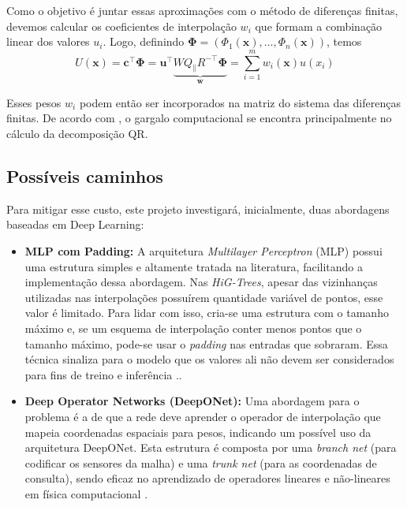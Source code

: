 \documentclass[
	12pt,				%
	oneside,			%
	a4paper,			%
	english,			%
	brazilian,				%
	]{article}
\begin{document}
	Como o objetivo é juntar essas aproximações com o método de diferenças finitas, devemos calcular os coeficientes de interpolação $w_i$ que formam a combinação linear dos valores $u_i$. Logo, definindo $\boldsymbol{\Phi} = (\Phi_1(\mathbf{x}), \dots, \Phi_n(\mathbf{x}))$, temos
	\begin{equation}
		U(\mathbf{x}) = \mathbf{c}^\top \boldsymbol{\Phi} = \mathbf{u}^\top \underbrace{W Q_{\parallel} R^{-\top} \boldsymbol{\Phi}}_{\mathbf{w}} = \sum_{i=1}^{m}w_i(\mathbf{x})u(x_i)
	\end{equation}
	
	Esses pesos $w_i$ podem então ser incorporados na matriz do sistema das diferenças finitas. De acordo com \cite{Sousa2019}, o gargalo computacional se encontra principalmente no cálculo da decomposição QR. 

	\subsection{Possíveis caminhos}
	Para mitigar esse custo, este projeto investigará, inicialmente, duas abordagens baseadas em Deep Learning:

	\begin{itemize}
		\item \textbf{MLP com Padding:} A arquitetura \textit{Multilayer Perceptron} (MLP) possui uma estrutura simples e altamente tratada na literatura, facilitando a implementação dessa abordagem. Nas \textit{HiG-Trees}, apesar das vizinhanças utilizadas nas interpolações possuírem quantidade variável de pontos, esse valor é limitado. Para lidar com isso, cria-se uma estrutura com o tamanho máximo e, se um esquema de interpolação conter menos pontos que o tamanho máximo, pode-se usar o \textit{padding} nas entradas que sobraram. Essa técnica sinaliza para o modelo que os valores ali não devem ser considerados para fins de treino e inferência \cite{Goodfellow-et-al-2016}..
		
		\item \textbf{Deep Operator Networks (DeepONet):} Uma abordagem para o problema é a de que a rede deve aprender o operador de interpolação que mapeia coordenadas espaciais para pesos, indicando um possível uso da arquitetura DeepONet. Esta estrutura é composta por uma \textit{branch net} (para codificar os sensores da malha) e uma \textit{trunk net} (para as coordenadas de consulta), sendo eficaz no aprendizado de operadores lineares e não-lineares em física computacional \cite{Lu2021}.
	\end{itemize}
\end{document}
